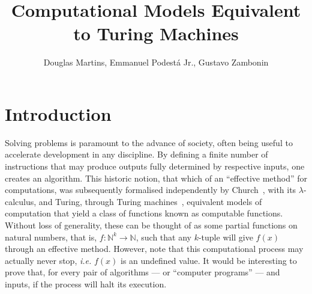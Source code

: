 \documentclass[12pt]{article}
\title{Computational Models Equivalent to Turing Machines}
\author{Douglas Martins\inst{1}, Emmanuel Podestá Jr.\inst{1}, Gustavo Zambonin\inst{1}}
\begin{document}
 

\maketitle

\section{Introduction}\label{sec:intro}
 
Solving problems is paramount to the advance of society, often being useful to accelerate development in any discipline. By defining a finite number of instructions that may produce outputs fully determined by respective inputs, one creates an algorithm. This historic notion, that which of an ``effective method'' for computations, was subsequently formalised independently by Church~\cite{}, with its $\lambda$-calculus, and Turing, through Turing machines~\cite{}, equivalent models of computation that yield a class of functions known as computable functions. Without loss of generality, these can be thought of as some partial functions on natural numbers, that is, $f : \mathbb{N}^{k} \rightarrow \mathbb{N}$, such that any $k$-tuple will give $f(x)$ through an effective method. However, note that this computational process may actually never stop, \emph{i.e.} $f(x)$ is an undefined value. It would be interesting to prove that, for every pair of algorithms --- or ``computer programs'' --- and inputs, if the process will halt its execution. 
\end{document}
